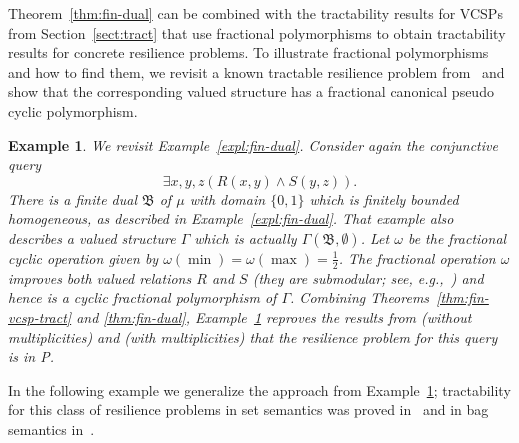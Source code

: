 \documentclass[nonacm]{acmart}
\newcommand{\bB}{{\mathfrak B}}
\newtheorem{expl}[theorem]{Example}
\begin{document}
Theorem~\ref{thm:fin-dual} can be combined with the tractability results for VCSPs from Section~\ref{sect:tract} that use fractional polymorphisms to obtain tractability results for concrete resilience problems. To illustrate fractional polymorphisms and how to find them, we revisit a known tractable resilience problem from~\cite{Meliou2010,Resilience-Arxive,Resilience,NewResilience}
and show that the corresponding valued structure has a fractional canonical pseudo cyclic polymorphism. 

\begin{expl}\label{expl:fin-dual-rev}
We  revisit Example~\ref{expl:fin-dual}. Consider again
 the conjunctive query
$$ \exists x,y,z (R(x,y) \wedge S(y,z)).$$
There is a finite dual $\bB$ of $\mu$ with domain $\{0,1\}$ which is finitely bounded homogeneous, as described in Example~\ref{expl:fin-dual}. That example also describes
a valued structure $\Gamma$ which is actually  $\Gamma(\bB,\emptyset)$.
Let $\omega$ be the fractional cyclic operation given by $\omega(\min) = \omega(\max) = \frac{1}{2}$.
The fractional operation $\omega$ improves both valued relations $R$ and $S$ (they are \emph{submodular}; see, e.g.,~\cite{KrokhinZivny17}) and hence is a cyclic fractional polymorphism of $\Gamma$.
Combining 
Theorems~\ref{thm:fin-vcsp-tract} and \ref{thm:fin-dual}, Example~\ref{expl:fin-dual-rev} reproves the results from \cite{Resilience} (without multiplicities) and \cite{LatestResilience} (with multiplicities) that the resilience problem for this query is in P.
\end{expl}
In the following example we generalize the approach from Example~\ref{expl:fin-dual-rev}; tractability for this class of resilience problems in set semantics was proved in~\cite{Resilience} and in bag semantics in~\cite{LatestResilience}.
\end{document}
